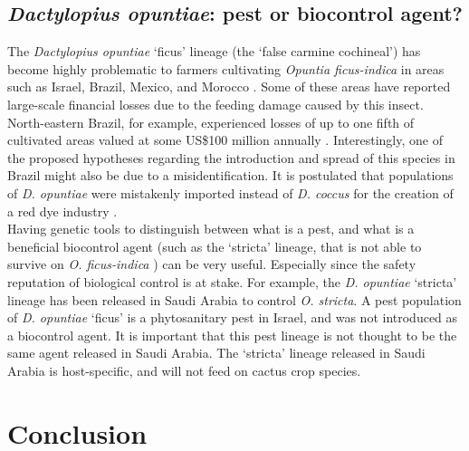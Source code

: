 \subsection{\textit{Dactylopius opuntiae}: pest or biocontrol agent?}
The \textit{Dactylopius opuntiae} `ficus' lineage (the `false
carmine cochineal') has become highly problematic to farmers cultivating \textit{Opuntia ficus-indica} in areas such as Israel, Brazil, Mexico, and Morocco \citep{spodek2014first, cruz2016autonomous, torres2018management}. Some of these areas have reported large-scale financial losses due to the feeding damage caused by this insect. North-eastern Brazil, for example, experienced losses of up to one fifth of cultivated areas valued at some US\$100 million annually \citep{torres2018management, mazzeo2019dactylopius}. Interestingly, one of the proposed hypotheses regarding the introduction and spread of this species in Brazil might also be due to a misidentification. It is postulated that populations of \textit{D. opuntiae} were mistakenly imported instead of \textit{D. coccus} for the creation of a red dye industry \citep{torres2018management}. \\
Having genetic tools to distinguish between what is a pest, and what is a beneficial biocontrol agent (such as the `stricta' lineage, that is not able to survive on \textit{O. ficus-indica} \citep{githure1999host}) can be very useful. Especially since the safety reputation of biological control is at stake. For example, the \textit{D. opuntiae} `stricta' lineage has been released in Saudi Arabia to control \textit{O. stricta}. A pest population of \textit{D. opuntiae} `ficus' is a phytosanitary pest in Israel, and was not introduced as a biocontrol agent. It is important that this pest lineage is not thought to be the same agent released in Saudi Arabia. The `stricta' lineage released in Saudi Arabia is host-specific, and will not feed on cactus crop species.

\section{Conclusion}

